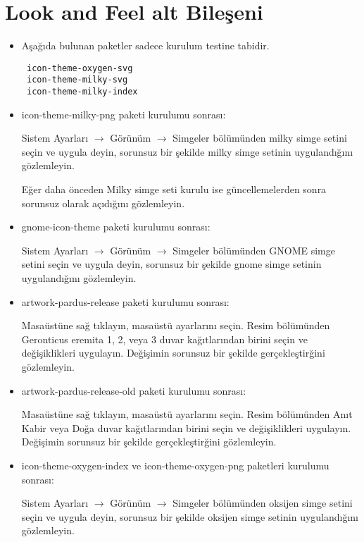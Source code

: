 \documentclass[a4paper,10pt]{article}
\begin{document}
\section{Look and Feel alt Bileşeni}
\begin{itemize}
\item Aşağıda bulunan paketler sadece kurulum testine tabidir.
\begin{verbatim}
 icon-theme-oxygen-svg
 icon-theme-milky-svg
 icon-theme-milky-index
\end{verbatim}

\item icon-theme-milky-png paketi kurulumu sonrası:

Sistem Ayarları $\rightarrow$ Görünüm $\rightarrow$ Simgeler bölümünden milky simge setini seçin ve uygula deyin, sorunsuz bir şekilde milky simge setinin uygulandığını gözlemleyin.

Eğer daha önceden Milky simge seti kurulu ise güncellemelerden sonra sorunsuz olarak açıdığını gözlemleyin.

\item gnome-icon-theme paketi kurulumu sonrası:

Sistem Ayarları $\rightarrow$ Görünüm $\rightarrow$ Simgeler bölümünden GNOME simge setini seçin ve uygula deyin, sorunsuz bir şekilde gnome simge setinin uygulandığını gözlemleyin.

\item artwork-pardus-release paketi kurulumu sonrası:

Masaüstüne sağ tıklayın, masaüstü ayarlarını seçin. Resim bölümünden Geronticus eremita 1, 2, veya 3 duvar kağıtlarından birini seçin ve değişiklikleri uygulayın. Değişimin sorunsuz bir şekilde gerçekleştirğini gözlemleyin.

\item artwork-pardus-release-old paketi kurulumu sonrası:

Masaüstüne sağ tıklayın, masaüstü ayarlarını seçin. Resim bölümünden Anıt Kabir veya Doğa duvar kağıtlarından birini seçin ve değişiklikleri uygulayın. Değişimin sorunsuz bir şekilde gerçekleştirğini gözlemleyin.

\item icon-theme-oxygen-index ve icon-theme-oxygen-png paketleri kurulumu sonrası: 

Sistem Ayarları $\rightarrow$ Görünüm $\rightarrow$ Simgeler bölümünden oksijen simge setini seçin ve uygula deyin, sorunsuz bir şekilde oksijen simge setinin uygulandığını gözlemleyin.


\end{itemize}
\end{document}
